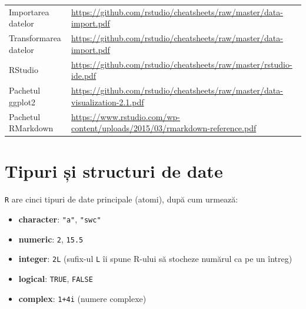 \documentclass[]{article}
\providecommand{\tightlist}{%
  \setlength{\itemsep}{0pt}\setlength{\parskip}{0pt}}
\begin{document}
\begin{longtable}[]{@{}ll@{}}
\begin{minipage}[t]{0.32\columnwidth}
Importarea datelor\strut
\end{minipage} & \begin{minipage}[t]{0.62\columnwidth}\raggedright\strut
\url{https://github.com/rstudio/cheatsheets/raw/master/data-import.pdf}\strut
\end{minipage}\tabularnewline
\begin{minipage}[t]{0.32\columnwidth}\raggedright\strut
Transformarea datelor\strut
\end{minipage} & \begin{minipage}[t]{0.62\columnwidth}\raggedright\strut
\url{https://github.com/rstudio/cheatsheets/raw/master/data-import.pdf}\strut
\end{minipage}\tabularnewline
\begin{minipage}[t]{0.32\columnwidth}\raggedright\strut
RStudio\strut
\end{minipage} & \begin{minipage}[t]{0.62\columnwidth}\raggedright\strut
\url{https://github.com/rstudio/cheatsheets/raw/master/rstudio-ide.pdf}\strut
\end{minipage}\tabularnewline
\begin{minipage}[t]{0.32\columnwidth}\raggedright\strut
Pachetul ggplot2\strut
\end{minipage} & \begin{minipage}[t]{0.62\columnwidth}\raggedright\strut
\url{https://github.com/rstudio/cheatsheets/raw/master/data-visualization-2.1.pdf}\strut
\end{minipage}\tabularnewline
\begin{minipage}[t]{0.32\columnwidth}\raggedright\strut
Pachetul RMarkdown\strut
\end{minipage} & \begin{minipage}[t]{0.62\columnwidth}\raggedright\strut
\url{https://www.rstudio.com/wp-content/uploads/2015/03/rmarkdown-reference.pdf}\strut
\end{minipage}\tabularnewline
\bottomrule
\end{longtable}

\section{Tipuri și structuri de date}\label{tipuri-si-structuri-de-date}

\texttt{R} are cinci tipuri de date principale (atomi), după cum
urmează:

\begin{itemize}
\tightlist
\item
  \textbf{character}: \texttt{"a"}, \texttt{"swc"}
\item
  \textbf{numeric}: \texttt{2}, \texttt{15.5}
\item
  \textbf{integer}: \texttt{2L} (sufix-ul \texttt{L} îi spune R-ului să
  stocheze numărul ca pe un întreg)
\item
  \textbf{logical}: \texttt{TRUE}, \texttt{FALSE}
\item
  \textbf{complex}: \texttt{1+4i} (numere complexe)
\end{itemize}
\end{document}
